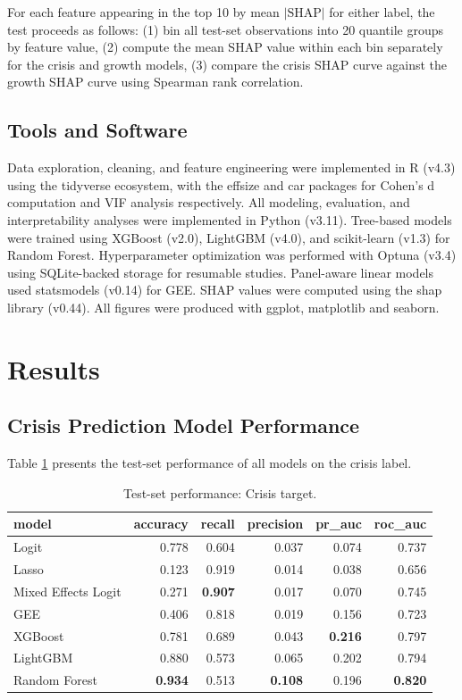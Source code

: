 \documentclass[conference]{IEEEtran}
\begin{document}
For each feature appearing in the top 10 by mean $|\mathrm{SHAP}|$ for either label, the test proceeds as follows: (1) bin all test-set observations into 20 quantile groups by feature value, (2) compute the mean SHAP value within each bin separately for the crisis and growth models, (3) compare the crisis SHAP curve against the growth SHAP curve using Spearman rank correlation. 

\subsection{Tools and Software}
Data exploration, cleaning, and feature engineering were implemented in R (v4.3) using the tidyverse ecosystem, with the effsize and car packages for Cohen's d computation and VIF analysis respectively. All modeling, evaluation, and interpretability analyses were implemented in Python (v3.11). Tree-based models were trained using XGBoost (v2.0), LightGBM (v4.0), and scikit-learn (v1.3) for Random Forest. Hyperparameter optimization was performed with Optuna (v3.4) using SQLite-backed storage for resumable studies. Panel-aware linear models used statsmodels (v0.14) for GEE. SHAP values were computed using the shap library (v0.44). All figures were produced with ggplot, matplotlib and seaborn. 

\section{Results}
\subsection{Crisis Prediction Model Performance}

Table \ref{tab:test_metrics_crisis} presents the test-set performance of all models on the crisis label. 

\begin{table}
\caption{Test-set performance: Crisis target.}
\label{tab:test_metrics_crisis}
\begin{tabular}{lrrrrr}
\toprule
model & accuracy & recall & precision & pr\_auc & roc\_auc \\
\midrule
Logit & 0.778 & 0.604 & 0.037 & 0.074 & 0.737 \\
Lasso & 0.123 & 0.919 & 0.014 & 0.038 & 0.656 \\
Mixed Effects Logit & 0.271 & \textbf{0.907} & 0.017 & 0.070 & 0.745 \\
GEE & 0.406 & 0.818 & 0.019 & 0.156 & 0.723 \\
XGBoost & 0.781 & 0.689 & 0.043 & \textbf{0.216} & 0.797 \\
LightGBM & 0.880 & 0.573 & 0.065 & 0.202 & 0.794 \\
Random Forest & \textbf{0.934} & 0.513 & \textbf{0.108} & 0.196 & \textbf{0.820} \\
\bottomrule
\end{tabular}
\end{table}
\end{document}
